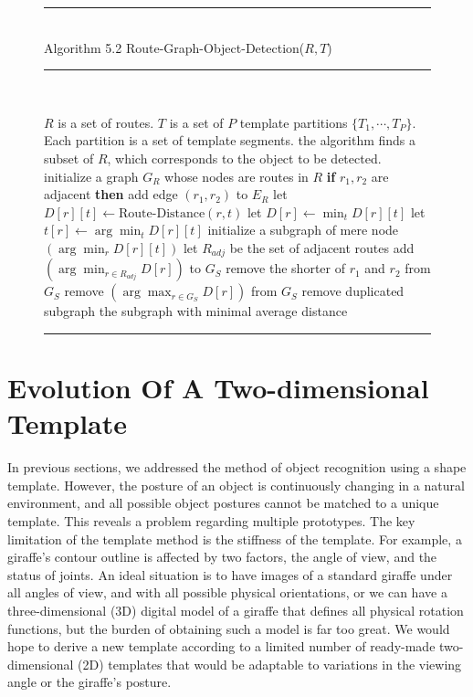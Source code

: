 \documentclass[journal]{IEEEtran}
\newenvironment{myalgorithm}[1]%
{\begin{figure}[!h]\small\noindent\rule{\linewidth}{1pt}\\#1\vspace{-0.5em}\\%
\rule{\linewidth}{0.5pt}\\\vspace{-1.5em}}%
{\vspace{-0.5em}\rule{\linewidth}{1pt}\end{figure}}
\begin{document}
\begin{myalgorithm}{Algorithm 5.2 Route-Graph-Object-Detection($R,T$)}
\begin{algorithmic}[1]
\REQUIRE $R$ is a set of routes. $T$ is a set of $P$ template partitions
$\{T_1,\cdots,T_P\}$. Each partition is a set of template segments.
\ENSURE the algorithm finds a subset of $R$, which corresponds to the object to be detected.
\STATE initialize a graph $G_R$ whose nodes are routes in $R$
  \STATE \textbf{if} $r_1,r_2$ are adjacent \textbf{then} add edge $(r_1,r_2)$ to $E_R$
\ENDFOR
{}
    \STATE let $D[r][t]\leftarrow\text{Route-Distance}(r,t)$
  \ENDFOR
    \STATE let $D[r]\leftarrow\min_t D[r][t]$
    \STATE let $t[r]\leftarrow\arg\min_t D[r][t]$
  \ENDFOR
    \STATE initialize a subgraph of mere node $(\arg\min_r D[r][t])$
  \ENDFOR
  \REPEAT
      \STATE let $R_{adj}$ be the set of adjacent routes
        \STATE add $(\arg\min_{r\in R_{adj}}D[r])$ to $G_S$
      \ENDIF
        \STATE remove the shorter of $r_1$ and $r_2$ from $G_S$
      \ENDIF
        \STATE remove $(\arg\max_{r\in G_S}D[r])$ from $G_S$
      \ENDIF
    \ENDFOR
    \STATE remove duplicated subgraph
\ENDFOR
\RETURN the subgraph with minimal average distance
\end{algorithmic}
\end{myalgorithm}

\section{Evolution Of A Two-dimensional Template}

In previous sections, we addressed the method of object recognition using a shape template. 
However, the posture of an object is continuously changing in a natural environment, 
and all possible object postures cannot be matched to a unique template. 
This reveals a problem regarding multiple prototypes. 
The key limitation of the template method is the stiffness of the template. 
For example, a giraffe's contour outline is affected by two factors, 
the angle of view, and the status of joints. 
An ideal situation is to have images of a standard giraffe under all angles of view, 
and with all possible physical orientations, 
or we can have a three-dimensional (3D) digital model of a giraffe that defines all physical rotation functions, 
but the burden of obtaining such a model is far too great. 
We would hope to derive a new template according to a limited number of ready-made two-dimensional (2D) templates that would be adaptable to variations in the viewing angle or the giraffe's posture.
\end{document}
